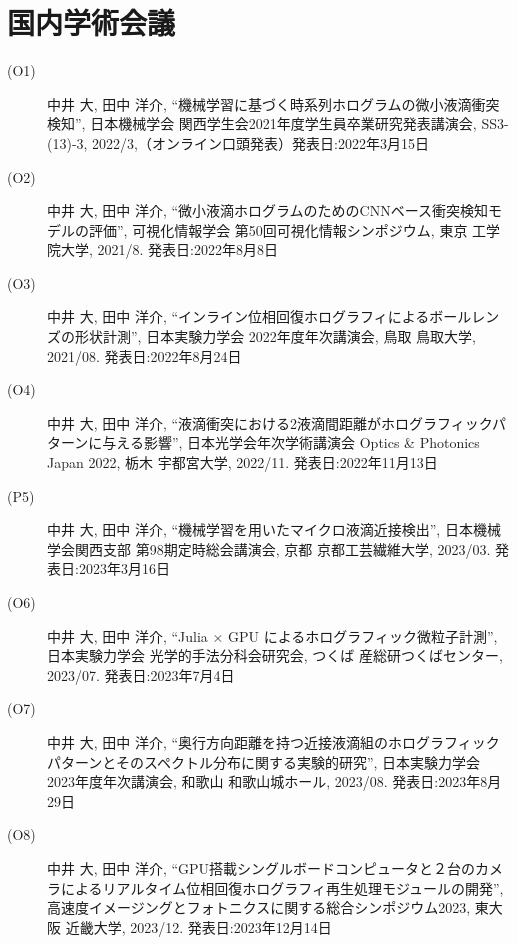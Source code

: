 \section*{国内学術会議}
\begin{description}
    \item[(O1)] 中井 大, 田中 洋介, “機械学習に基づく時系列ホログラムの微小液滴衝突検知”, 日本機械学会 関西学生会2021年度学生員卒業研究発表講演会, SS3-(13)-3, 2022/3,（オンライン口頭発表）発表日:2022年3月15日
    \item[(O2)] 中井 大, 田中 洋介, “微小液滴ホログラムのためのCNNベース衝突検知モデルの評価”, 可視化情報学会 第50回可視化情報シンポジウム, 東京 工学院大学, 2021/8. 発表日:2022年8月8日
    \item[(O3)] 中井 大, 田中 洋介, “インライン位相回復ホログラフィによるボールレンズの形状計測”, 日本実験力学会 2022年度年次講演会, 鳥取 鳥取大学, 2021/08. 発表日:2022年8月24日
    \item[(O4)] 中井 大, 田中 洋介, “液滴衝突における2液滴間距離がホログラフィックパターンに与える影響”, 日本光学会年次学術講演会 Optics \& Photonics Japan 2022, 栃木 宇都宮大学, 2022/11. 発表日:2022年11月13日
    \item[(P5)] 中井 大, 田中 洋介, “機械学習を用いたマイクロ液滴近接検出”, 日本機械学会関西支部 第98期定時総会講演会, 京都 京都工芸繊維大学, 2023/03. 発表日:2023年3月16日
    \item[(O6)] 中井 大, 田中 洋介, “Julia × GPU によるホログラフィック微粒子計測”, 日本実験力学会 光学的手法分科会研究会, つくば 産総研つくばセンター, 2023/07. 発表日:2023年7月4日
    \item[(O7)] 中井 大, 田中 洋介, “奥行方向距離を持つ近接液滴組のホログラフィックパターンとそのスペクトル分布に関する実験的研究”, 日本実験力学会 2023年度年次講演会, 和歌山 和歌山城ホール, 2023/08. 発表日:2023年8月29日
    \item[(O8)] 中井 大, 田中 洋介, “GPU搭載シングルボードコンピュータと２台のカメラによるリアルタイム位相回復ホログラフィ再生処理モジュールの開発”, 高速度イメージングとフォトニクスに関する総合シンポジウム2023, 東大阪 近畿大学, 2023/12. 発表日:2023年12月14日
\end{description}